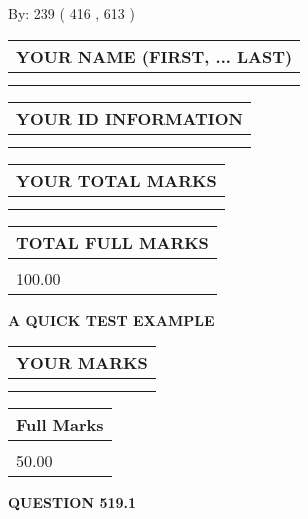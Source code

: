 \documentclass[12pt]{article}
\begin{document}
   
\hspace{1.0in} By: 
 239 ( 416 ,  613 )
   
   
   
   
\newpage 
\setcounter{page}{ 
   519001 } 
   
   
   
   
\noindent\begin{tabular}{|l|}
\hline
YOUR NAME (FIRST, ... LAST)  \\
\hline
 \\ 
 \\ 
\hline
\end{tabular}
\hspace{0.05in} \begin{tabular}{|l|}
\hline
 YOUR   ID   INFORMATION  \\
\hline
 \\ 
 \\ 
\hline
\end{tabular}
   
   
\vspace{0.2in}\noindent\begin{tabular}{|l|}
\hline
YOUR TOTAL MARKS  \\
\hline
 \\ 
 \\ 
\hline
\end{tabular}
\hspace{0.05in} \begin{tabular}{|l|}
\hline
TOTAL FULL MARKS  \\
\hline
 \\ 
100.00 \\
\hline
\end{tabular}
   
   
 \vspace{0.2in}
{\LARGE {\textbf{ A QUICK TEST EXAMPLE}}}
   
   
  
\vspace{0.2in}
  
\noindent\begin{tabular}{|l|}
\hline
 YOUR MARKS  \\
\hline
 \\ 
 \\ 
\hline
\end{tabular}
\hspace{0.05in} \begin{tabular}{|l|}
\hline
 Full Marks  \\
\hline
 \\ 
50.00 \\
\hline
\end{tabular}
{\textbf{\Large{QUESTION
519.1 
}}}
  
\end{document}
